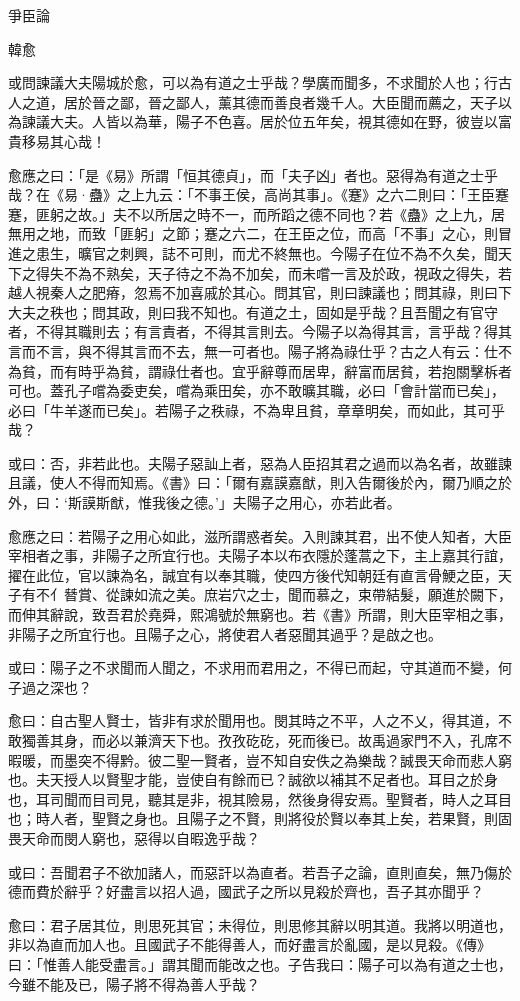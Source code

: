 爭臣論

韓愈

或問諫議大夫陽城於愈，可以為有道之士乎哉？學廣而聞多，不求聞於人也；行古人之道，居於晉之鄙，晉之鄙人，薰其德而善良者幾千人。大臣聞而薦之，天子以為諫議大夫。人皆以為華，陽子不色喜。居於位五年矣，視其德如在野，彼豈以富貴移易其心哉！

愈應之曰：「是《易》所謂「恒其德貞」，而「夫子凶」者也。惡得為有道之士乎哉？在《易·蠱》之上九云：「不事王侯，高尚其事」。《蹇》之六二則曰：「王臣蹇蹇，匪躬之故。」夫不以所居之時不一，而所蹈之德不同也？若《蠱》之上九，居無用之地，而致「匪躬」之節；蹇之六二，在王臣之位，而高「不事」之心，則冒進之患生，曠官之刺興，誌不可則，而尤不終無也。今陽子在位不為不久矣，聞天下之得失不為不熟矣，天子待之不為不加矣，而未嚐一言及於政，視政之得失，若越人視秦人之肥瘠，忽焉不加喜戚於其心。問其官，則曰諫議也；問其祿，則曰下大夫之秩也；問其政，則曰我不知也。有道之土，固如是乎哉？且吾聞之有官守者，不得其職則去；有言責者，不得其言則去。今陽子以為得其言，言乎哉？得其言而不言，與不得其言而不去，無一可者也。陽子將為祿仕乎？古之人有云：仕不為貧，而有時乎為貧，謂祿仕者也。宜乎辭尊而居卑，辭富而居貧，若抱關擊柝者可也。蓋孔子嚐為委吏矣，嚐為乘田矣，亦不敢曠其職，必曰「會計當而已矣」，必曰「牛羊遂而已矣」。若陽子之秩祿，不為卑且貧，章章明矣，而如此，其可乎哉？

或曰：否，非若此也。夫陽子惡訕上者，惡為人臣招其君之過而以為名者，故雖諫且議，使人不得而知焉。《書》曰：「爾有嘉謨嘉猷，則入告爾後於內，爾乃順之於外，曰：‘斯謨斯猷，惟我後之德。’」夫陽子之用心，亦若此者。

愈應之曰：若陽子之用心如此，滋所謂惑者矣。入則諫其君，出不使人知者，大臣宰相者之事，非陽子之所宜行也。夫陽子本以布衣隱於蓬蒿之下，主上嘉其行誼，擢在此位，官以諫為名，誠宜有以奉其職，使四方後代知朝廷有直言骨鯁之臣，天子有不亻朁賞、從諫如流之美。庶岩穴之士，聞而慕之，束帶結髮，願進於闕下，而伸其辭說，致吾君於堯舜，熙鴻號於無窮也。若《書》所謂，則大臣宰相之事，非陽子之所宜行也。且陽子之心，將使君人者惡聞其過乎？是啟之也。

或曰：陽子之不求聞而人聞之，不求用而君用之，不得已而起，守其道而不變，何子過之深也？

愈曰：自古聖人賢士，皆非有求於聞用也。閔其時之不平，人之不乂，得其道，不敢獨善其身，而必以兼濟天下也。孜孜矻矻，死而後已。故禹過家門不入，孔席不暇暖，而墨突不得黔。彼二聖一賢者，豈不知自安佚之為樂哉？誠畏天命而悲人窮也。夫天授人以賢聖才能，豈使自有餘而已？誠欲以補其不足者也。耳目之於身也，耳司聞而目司見，聽其是非，視其險易，然後身得安焉。聖賢者，時人之耳目也；時人者，聖賢之身也。且陽子之不賢，則將役於賢以奉其上矣，若果賢，則固畏天命而閔人窮也，惡得以自暇逸乎哉？

或曰：吾聞君子不欲加諸人，而惡訐以為直者。若吾子之論，直則直矣，無乃傷於德而費於辭乎？好盡言以招人過，國武子之所以見殺於齊也，吾子其亦聞乎？

愈曰：君子居其位，則思死其官；未得位，則思修其辭以明其道。我將以明道也，非以為直而加人也。且國武子不能得善人，而好盡言於亂國，是以見殺。《傳》曰：「惟善人能受盡言。」謂其聞而能改之也。子告我曰：陽子可以為有道之士也，今雖不能及已，陽子將不得為善人乎哉？